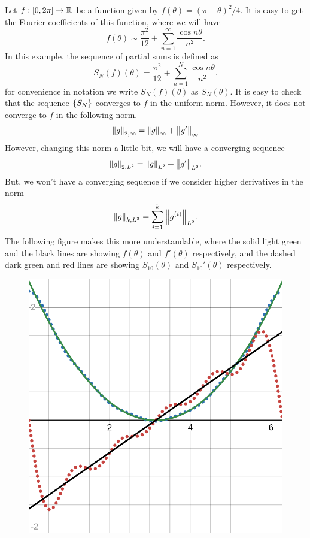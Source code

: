 \begin{example}
	Let $ f: [0,2\pi] \to \mathbb{R} $ be a function given by $ f(\theta) = (\pi - \theta)^2/4 $. It is easy to get the Fourier coefficients of this function, where we will have
	\[ f(\theta) \sim \frac{\pi^2}{12} + \sum_{n=1}^{\infty}\frac{\cos n\theta}{n^2}. \]
	In this example, the sequence of partial sums is defined as 
	\[ S_N(f)(\theta) = \frac{\pi^2}{12} + \sum_{n=1}^{N}\frac{\cos n\theta}{n^2}. \]
	for convenience in notation we write $ S_N(f)(\theta) $ as $ S_N(\theta) $. It is easy to check that the sequence $ \{S_N\} $ converges to $ f $ in the uniform norm. However, it does not converge to $ f $ in the following norm.
	\[ \norm{g}_{2,\infty} = \norm{g}_\infty + \norm{g'}_\infty \]
	However, changing this norm a little bit, we will have a converging sequence
	\[ \norm{g}_{2,L^2} = \norm{g}_{L^2} + \norm{g'}_{L^2}. \] 
	But, we won't have a converging sequence if we consider higher derivatives in the norm
	\[ \norm{g}_{k,L^2} = \sum_{i=1}^{k} \norm{g^{(i)}}_{L^2}. \]
	The following figure makes this more understandable, where the solid light green and the black lines are showing $ f(\theta) $ and $ f'(\theta) $ respectively, and the dashed dark green and red lines are showing $ S_{10}(\theta) $ and $ S_{10}'(\theta) $ respectively.
	\begin{figure}[h!]
		\centering
		\includegraphics[width=0.3\linewidth]{Images/FourierConvergence}
		\label{fig:fourierconvergence}
	\end{figure}
	\FloatBarrier

	
\end{example}



